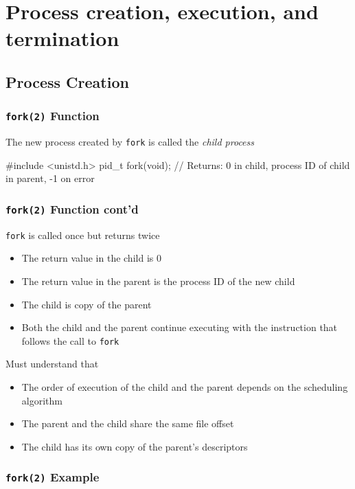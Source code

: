 \documentclass[newPxFont,sthlmFooter,nooffset]{beamer}
\begin{document}
\section{Process creation, execution, and termination}

\subsection{Process Creation}
\begin{frame}[containsverbatim,t]
  \frametitle{\texttt{fork(2)} Function}

The new process created by \texttt{fork} is called the \textit{child process}

\begin{codedef}
#include <unistd.h>
pid_t fork(void);
// Returns: 0 in child, process ID of child in parent, -1 on error
\end{codedef}
\end{frame}

\begin{frame}[t]
  \frametitle{\texttt{fork(2)} Function cont'd}
\texttt{fork} is called once but returns twice
\begin{itemize}
\item The return value in the child is 0
\item The return value in the parent is the process ID of the new child
\item The child is copy of the parent
\item Both the child and the parent continue executing with the instruction that follows the call to \texttt{fork}
\end{itemize}  

Must understand that
\begin{itemize}
\item The order of execution of the child and the parent depends on the scheduling algorithm
\item The parent and the child share the same file offset
\item The child has its own copy of the parent's descriptors
\end{itemize}  
\end{frame}


\begin{frame}[containsverbatim,t]
  \frametitle{\texttt{fork(2)} Example}


\end{frame}
\end{document}
